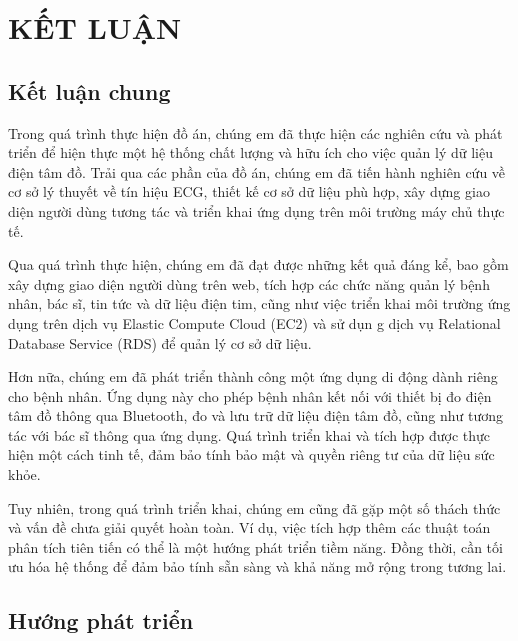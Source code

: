 
\section*{KẾT LUẬN}
\subsection*{Kết luận chung}


Trong quá trình thực hiện đồ án,
 chúng em đã thực hiện các nghiên cứu và phát 
 triển để hiện thực một hệ thống chất lượng và hữu ích
  cho việc quản lý dữ liệu điện tâm đồ. Trải qua các phần
   của đồ án, chúng em đã tiến hành nghiên cứu về cơ sở lý
    thuyết về tín hiệu ECG, thiết kế cơ sở dữ liệu phù hợp,
     xây dựng giao diện người dùng tương tác và triển khai
      ứng dụng trên môi trường máy chủ thực tế.

      Qua quá trình
      thực hiện, chúng em đã đạt được những kết quả đáng kể,
      bao gồm xây dựng giao diện người dùng trên web, tích hợp các
       chức năng quản lý bệnh nhân, bác sĩ, tin tức và dữ liệu điện tim, cũng như việc triển khai môi trường ứng dụng
         trên dịch vụ Elastic Compute Cloud (EC2) và sử dụn
         g dịch vụ Relational Database Service (RDS) để quản lý
          cơ sở dữ liệu.

Hơn nữa, chúng em đã phát triển thành công một ứng dụng di
 động dành riêng cho bệnh nhân. Ứng dụng này cho phép bệnh
  nhân kết nối với thiết bị đo điện tâm đồ thông qua
   Bluetooth, đo và lưu trữ dữ liệu điện tâm đồ, cũng
    như tương tác với bác sĩ thông qua ứng dụng. Quá trình
     triển khai và tích hợp được thực hiện một cách tinh tế, 
     đảm bảo tính bảo mật và quyền riêng tư của dữ liệu sức khỏe.



Tuy nhiên, trong quá trình triển khai, chúng em cũng đã gặp một số thách thức và vấn đề chưa giải quyết hoàn toàn. Ví dụ, việc tích hợp thêm các thuật toán phân tích tiên tiến có thể là một hướng phát triển tiềm năng. Đồng thời, cần tối ưu hóa hệ thống để đảm bảo tính sẵn sàng và khả năng mở rộng trong tương lai.

\subsection*{Hướng phát triển}


